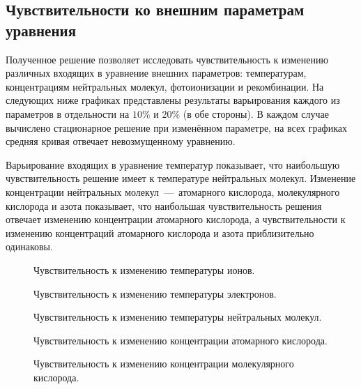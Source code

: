 \documentclass[14pt, a4paper, fleqn]{extarticle}
\begin{document}
\subsection{Чувствительности ко внешним параметрам уравнения}



Полученное решение позволяет исследовать чувствительность к изменению различных входящих в уравнение внешних параметров: температурам, концентрациям нейтральных молекул, фотоионизации и рекомбинации. На следующих ниже графиках представлены результаты варьирования каждого из параметров в отдельности на $10\%$ и $20\%$ (в обе стороны). В каждом случае вычислено стационарное решение при изменённом параметре, на всех графиках средняя кривая отвечает невозмущенному уравнению.

\medskip

Варьирование входящих в уравнение температур показывает, что наибольшую чувствительность решение имеет к температуре нейтральных молекул. Изменение концентрации нейтральных молекул~---~атомарного кислорода, молекулярного кислорода и азота показывает, что наибольшая чувствительность решения отвечает изменению концентрации атомарного кислорода, а чувствительности к изменению концентраций атомарного кислорода и азота приблизительно одинаковы.

\medskip

\begin{figure}
\caption{Чувствительность к изменению температуры ионов.}
\end{figure}

\begin{figure}
\caption{Чувствительность к изменению температуры электронов.}
\end{figure}

\begin{figure}
\caption{Чувствительность к изменению температуры нейтральных молекул.}
\end{figure}

\begin{figure}
\caption{Чувствительность к изменению концентрации атомарного кислорода.}
\end{figure}

\begin{figure}
\caption{Чувствительность к изменению концентрации молекулярного кислорода.}
\end{figure}
\end{document}
